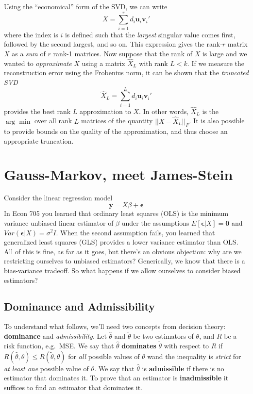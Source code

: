 \documentclass[12pt]{article}
\theoremstyle{definition}
\begin{document}
Using the ``economical'' form of the SVD, we can write
	$$X = \sum_{i=1}^r d_i \textbf{u}_i \textbf{v}_i'$$
where the index is $i$ is defined such that the \emph{largest} singular value comes first, followed by the second largest, and so on. This expression gives the rank-$r$ matrix $X$ as a \emph{sum} of $r$ rank-1 matrices. Now suppose that the rank of $X$ is large and we wanted to \emph{approximate} $X$ using a matrix $\widehat{X}_L$ with rank $L<k$. If we measure the reconstruction error using the Frobenius norm, it can be shown that the \emph{truncated SVD}
	$$\widehat{X}_L = \sum_{i=1}^{L} d_i \textbf{u}_i \textbf{v}_i'$$ 	
provides the best rank $L$ approximation to $X$. In other words, $\widehat{X}_L$ is the $\arg \min$  over all rank $L$ matrices of the quantity $||X - \widehat{X}_L||_F$. It is also possible to provide bounds on the quality of the approximation, and thus choose an appropriate truncation. 

\section{Gauss-Markov, meet James-Stein}
Consider the linear regression model
	$$\mathbf{y} = X\beta + \boldsymbol{\epsilon}$$
In Econ 705 you learned that ordinary least squares (OLS) is the minimum variance unbiased linear estimator of $\beta$ under the assumptions $E[\boldsymbol{\epsilon}|X] = \mathbf{0}$ and $Var(\mathbf{\epsilon}|X) = \sigma^2 I$. When the second assumption fails, you learned that generalized least squares (GLS) provides a lower variance estimator than OLS. All of this is fine, as far as it goes, but there's an obvious objection: why are we restricting ourselves to unbiased estimators? Generically, we know that there is a bias-variance tradeoff. So what happens if we allow ourselves to consider biased estimators? 



\subsection{Dominance and Admissibility}
To understand what follows, we'll need two concepts from decision theory: \textbf{dominance} and \emph{admissibility}. Let $\widehat{\theta}$ and $\widetilde{\theta}$ be two estimators of $\theta$, and $R$ be a risk function, e.g.\ MSE. We say that $\widehat{\theta}$ \textbf{dominates} $\widetilde{\theta}$ with respect to $R$ if $R(\widehat{\theta},\theta) \leq R(\widetilde{\theta},\theta)$ for \emph{all} possible values of $\theta$ wand the inequality is \emph{strict} for \emph{at least one} possible value of $\theta$. We say that $\widehat{\theta}$ is \textbf{admissible} if there is no estimator that dominates it. To prove that an estimator is \textbf{inadmissible} it suffices to find an estimator that dominates it.
\end{document}
